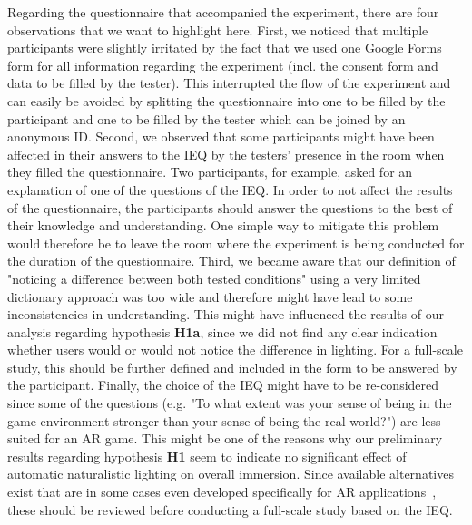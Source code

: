 \documentclass[12pt,twoside,english]{article}
\begin{document}
Regarding the questionnaire that accompanied the experiment, there are four observations that we want to highlight here.
First, we noticed that multiple participants were slightly irritated by the fact that we used one Google Forms form for all information regarding the experiment (incl. the consent form and data to be filled by the tester).
This interrupted the flow of the experiment and can easily be avoided by splitting the questionnaire into one to be filled by the participant and one to be filled by the tester which can be joined by an anonymous ID.
Second, we observed that some participants might have been affected in their answers to the \gls{IEQ} by the testers' presence in the room when they filled the questionnaire.
Two participants, for example, asked for an explanation of one of the questions of the \gls{IEQ}.
In order to not affect the results of the questionnaire, the participants should answer the questions to the best of their knowledge and understanding.
One simple way to mitigate this problem would therefore be to leave the room where the experiment is being conducted for the duration of the questionnaire.
Third, we became aware that our definition of "noticing a difference between both tested conditions" using a very limited dictionary approach was too wide and therefore might have lead to some inconsistencies in understanding.
This might have influenced the results of our analysis regarding hypothesis \textbf{H1a}, since we did not find any clear indication whether users would or would not notice the difference in lighting.
For a full-scale study, this should be further defined and included in the form to be answered by the participant.
Finally, the choice of the \gls{IEQ} might have to be re-considered since some of the questions (e.g. "To what extent was your sense of being in the game environment stronger than your sense of being the real world?") are less suited for an \gls{AR} game.
This might be one of the reasons why our preliminary results regarding hypothesis \textbf{H1} seem to indicate no significant effect of automatic naturalistic lighting on overall immersion.
Since available alternatives exist that are in some cases even developed specifically for \gls{AR} applications~\cite{georgiou_development_2017}, these should be reviewed before conducting a full-scale study based on the \gls{IEQ}.
\end{document}
